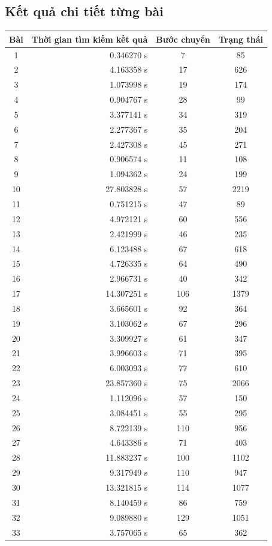 \documentclass[a4paper]{article}
\begin{document}
\subsection{Kết quả chi tiết từng bài}
\begin{center}
	\begin{tabular}{|c|r|c|c|}
		\hline
		Bài & Thời gian tìm kiếm kết quả & Bước chuyển & Trạng thái \\ \hline
		1   & 0.346270 s	& 7		& 85 \\ \hline
		2   & 4.163358 s	& 17	& 626 \\ \hline
		3	& 1.073998 s	& 19	& 174 \\ \hline
		4 	& 0.904767 s	& 28	& 99 \\ \hline
		5	& 3.377141 s	& 34	& 319 \\ \hline
		6	& 2.277367 s	& 35	& 204 \\ \hline
		7	& 2.427308 s	& 45	& 271 \\ \hline
		8	& 0.906574 s	& 11	& 108 \\ \hline
		9	& 1.094362 s	& 24	& 199 \\ \hline
		10	& 27.803828 s	& 57	& 2219 \\ \hline
		11	& 0.751215 s	& 47	& 89 \\ \hline
		12	& 4.972121 s	& 60	& 556 \\ \hline
		13	& 2.421999 s	& 46	& 235 \\ \hline
		14	& 6.123488 s	& 67	& 618 \\ \hline
		15	& 4.726335 s	& 64	& 490 \\ \hline
		16	& 2.966731 s	& 40	& 342 \\ \hline
		17	& 14.307251 s	& 106	& 1379 \\ \hline
		18	& 3.665601 s	& 92	& 364 \\ \hline
		19	& 3.103062 s	& 67	& 296 \\ \hline
		20	& 3.309927 s	& 61	& 347 \\ \hline
		21	& 3.996603 s	& 71	& 395 \\ \hline
		22	& 6.003093 s	& 77	& 610 \\ \hline
		23	& 23.857360 s	& 75	& 2066 \\ \hline
		24	& 1.112096 s	& 57	& 150 \\ \hline
		25	& 3.084451 s	& 55	& 295 \\ \hline
		26	& 8.722139 s	& 110	& 956 \\ \hline
		27	& 4.643386 s	& 71	& 403 \\ \hline
		28	& 11.883237 s	& 100	& 1102 \\ \hline
		29	& 9.317949 s	& 110	& 947 \\ \hline
		30	& 13.321815 s	& 114	& 1077 \\ \hline
		31	& 8.140459 s	& 86	& 759 \\ \hline
		32	& 9.089880 s	& 129	& 1051 \\ \hline
		33	& 3.757065 s	& 65	& 362 \\ \hline
	\end{tabular}	
\end{center}
\newpage
\end{document}
